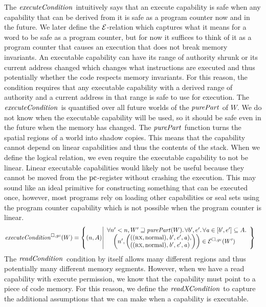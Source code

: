 \begin{jversion}
The $\execCond[]{}$ intuitively says that an execute capability is safe when any capability that can be derived from it is safe as a program counter now and in the future.
We later define the $\mathcal{E}$-relation which captures what it means for a word to be safe as a program counter, but for now it suffices to think of it as a program counter that causes an execution that does not break memory invariants.
An executable capability can have its range of authority shrunk or its current address changed which changes what instructions are executed and thus potentially whether the code respects memory invariants.
For this reason, the condition requires that any executable capability with a derived range of authority and a current address in that range is safe to use for execution.
The $\execCond[]{}$ is quantified over all future worlds of the $\purePart{}$ of $W$.
We do not know when the executable capability will be used, so it should be safe even in the future when the memory has changed.
The $\purePart{}$ function turns the spatial regions of a world into shadow copies.
This means that the capability cannot depend on linear capabilities and thus the contents of the stack.
When we define the logical relation, we even require the executable capability to not be linear.
Linear executable capabilities would likely not be useful because they cannot be moved from the $\mathrm{pc}$-register without crashing the execution.
This may sound like an ideal primitive for constructing something that can be executed once, however, most programs rely on loading other capabilities or seal sets using the program counter capability which is not possible when the program counter is linear.
\begin{align*}
  \execCond{W} &=
  \left\{ \npair{A} \middle|
    \begin{array}{l}
      \forall n' < n, W' \future \purePart{W}\ldotp \forall b',e'\ldotp \forall \aaddr \in [b',e'] \subseteq A \ldotp\\
      \quad \npair[n']{\left( \arraycolsep=0pt\array{l}((\rx,\normal),\baddr',\eaddr',\aaddr),\\((\rx,\normal),\baddr',\eaddr',\aaddr)\endarray\right)} \in \lre(W')
    \end{array}
    \right\}
\end{align*}
The $\readCond[]{}$ condition by itself allows many different regions and thus potentially many different memory segments.
However, when we have a read capability with execute permission, we know that the capability must point to a piece of code memory.
For this reason, we define the $\xReadCond[]{}$ to capture the additional assumptions that we can make when a capability is executable.

\end{jversion}
